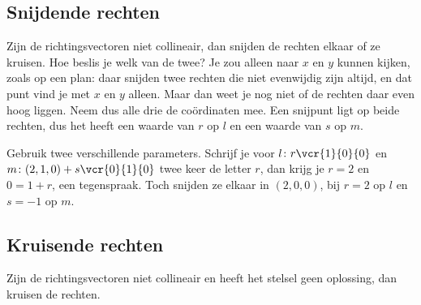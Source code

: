 \begin{oefeningen}
\end{oefeningen}

\subsection{Snijdende rechten}

Zijn de richtingsvectoren niet collineair, dan snijden de rechten elkaar of ze kruisen. Hoe beslis je welk van de twee? Je zou alleen naar $x$ en $y$ kunnen kijken, zoals op een plan: daar snijden twee rechten die niet evenwijdig zijn altijd, en dat punt vind je met $x$ en $y$ alleen. Maar dan weet je nog niet of de rechten daar even hoog liggen. Neem dus alle drie de coördinaten mee. Een snijpunt ligt op beide rechten, dus het heeft een waarde van $r$ op $l$ en een waarde van $s$ op $m$.


Gebruik twee verschillende parameters. Schrijf je voor $l\colon r\vcr{1}{0}{0}$ en $m\colon (2, 1, 0) + s\vcr{0}{1}{0}$ twee keer de letter $r$, dan krijg je $r = 2$ en $0 = 1 + r$, een tegenspraak. Toch snijden ze elkaar in $(2, 0, 0)$, bij $r = 2$ op $l$ en $s = -1$ op $m$.

\begin{oefeningen}
\end{oefeningen}

\subsection{Kruisende rechten}

Zijn de richtingsvectoren niet collineair en heeft het stelsel geen oplossing, dan kruisen de rechten.

